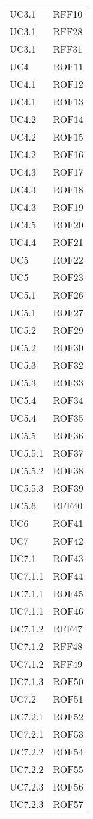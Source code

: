 \documentclass[../AnalisiDeiRequisiti_v3.0.0.tex]{subfiles}
\begin{document}
\begin{longtable}{p{4cm}!{\VRule[1pt]}p{4cm}}
UC3.1 & RFF10 \\
UC3.1 & RFF28 \\
UC3.1 & RFF31 \\
UC4 & ROF11 \\
UC4.1 & ROF12 \\
UC4.1 & ROF13 \\
UC4.2 & ROF14 \\
UC4.2 & ROF15 \\
UC4.2 & ROF16 \\
UC4.3 & ROF17 \\
UC4.3 & ROF18 \\
UC4.3 & ROF19 \\
UC4.5 & ROF20 \\
UC4.4 & ROF21 \\
UC5 & ROF22 \\
UC5 & ROF23 \\
UC5.1 & ROF26 \\
UC5.1 & ROF27 \\
UC5.2 & ROF29 \\
UC5.2 & ROF30 \\
UC5.3 & ROF32 \\
UC5.3 & ROF33 \\
UC5.4 & ROF34 \\
UC5.4 & ROF35 \\
UC5.5 & ROF36 \\
UC5.5.1 & ROF37 \\
UC5.5.2 & ROF38 \\
UC5.5.3 & ROF39 \\
UC5.6 & RFF40 \\
UC6 & ROF41 \\
UC7 & ROF42 \\
UC7.1 & ROF43 \\
UC7.1.1 & ROF44 \\
UC7.1.1 & ROF45 \\
UC7.1.1 & ROF46 \\
UC7.1.2 & RFF47 \\
UC7.1.2 & RFF48 \\
UC7.1.2 & RFF49 \\
UC7.1.3 & ROF50 \\
UC7.2 & ROF51 \\
UC7.2.1 & ROF52 \\
UC7.2.1 & ROF53 \\
UC7.2.2 & ROF54 \\
UC7.2.2 & ROF55 \\
UC7.2.3 & ROF56 \\
UC7.2.3 & ROF57 \\

\end{longtable}
\end{document}
